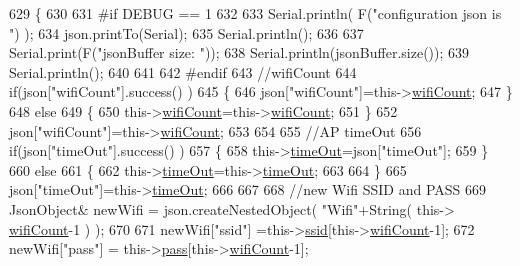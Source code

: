 \begin{DoxyCode}
629         \{
630         
631 \textcolor{preprocessor}{        #if DEBUG == 1 }
632         
633             Serial.println( F(\textcolor{stringliteral}{"configuration json is "}) );
634             json.printTo(Serial);
635             Serial.println();
636 
637             Serial.print(F(\textcolor{stringliteral}{"jsonBuffer size: "}));
638             Serial.println(jsonBuffer.size());
639             Serial.println();
640 
641 
642 \textcolor{preprocessor}{        #endif}
643             \textcolor{comment}{//wifiCount}
644             \textcolor{keywordflow}{if}(json[\textcolor{stringliteral}{"wifiCount"}].success() )
645             \{           
646                 json[\textcolor{stringliteral}{"wifiCount"}]=this->\hyperlink{class_cool_wifi_ab133bd92fcb895b884deecd6678592e4}{wifiCount};
647             \}
648             \textcolor{keywordflow}{else}
649             \{
650                 this->\hyperlink{class_cool_wifi_ab133bd92fcb895b884deecd6678592e4}{wifiCount}=this->\hyperlink{class_cool_wifi_ab133bd92fcb895b884deecd6678592e4}{wifiCount};
651             \}
652             json[\textcolor{stringliteral}{"wifiCount"}]=this->\hyperlink{class_cool_wifi_ab133bd92fcb895b884deecd6678592e4}{wifiCount};
653 
654             
655             \textcolor{comment}{//AP timeOut}
656             \textcolor{keywordflow}{if}(json[\textcolor{stringliteral}{"timeOut"}].success() )
657             \{
658                 this->\hyperlink{class_cool_wifi_a952111605f25156588b5632caaba1c6f}{timeOut}=json[\textcolor{stringliteral}{"timeOut"}];
659             \}
660             \textcolor{keywordflow}{else}
661             \{
662                 this->\hyperlink{class_cool_wifi_a952111605f25156588b5632caaba1c6f}{timeOut}=this->\hyperlink{class_cool_wifi_a952111605f25156588b5632caaba1c6f}{timeOut};
663 
664             \}
665             json[\textcolor{stringliteral}{"timeOut"}]=this->\hyperlink{class_cool_wifi_a952111605f25156588b5632caaba1c6f}{timeOut};
666             
667             
668             \textcolor{comment}{//new Wifi SSID and PASS}
669             JsonObject& newWifi = json.createNestedObject( \textcolor{stringliteral}{"Wifi"}+String( this->
      \hyperlink{class_cool_wifi_ab133bd92fcb895b884deecd6678592e4}{wifiCount}-1 ) );
670             
671             newWifi[\textcolor{stringliteral}{"ssid"}] =this->\hyperlink{class_cool_wifi_a893b21d0fed821438733bba2e73fb4c2}{ssid}[this->\hyperlink{class_cool_wifi_ab133bd92fcb895b884deecd6678592e4}{wifiCount}-1];
672             newWifi[\textcolor{stringliteral}{"pass"}] = this->\hyperlink{class_cool_wifi_a0c3332a149245aaad060b32593a54c9b}{pass}[this->\hyperlink{class_cool_wifi_ab133bd92fcb895b884deecd6678592e4}{wifiCount}-1];

\end{DoxyCode}
